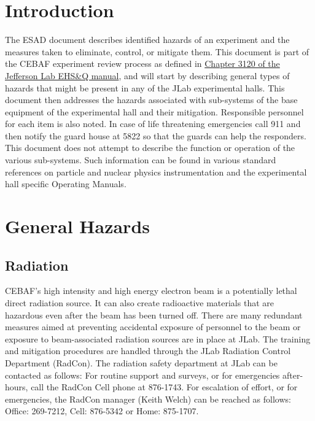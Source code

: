 
\chapter{Introduction}

The ESAD document describes identified hazards of an experiment and the measures taken to eliminate, control, or mitigate them.
This document is part of the CEBAF experiment review process as defined in
\href{http://www.jlab.org/ehs/ehsmanual/manual/3120.html}{Chapter 3120 of the Jefferson Lab EHS\&Q manual},
and will start by describing general types of hazards that might be present in any of the  
JLab experimental halls.  This document then addresses the hazards associated 
with sub-systems of the base equipment of the experimental hall and their 
mitigation.  Responsible personnel for each item is also noted.  
In case of life threatening 
emergencies call 911 and then notify the guard house at 5822 so that the guards can help
the responders.  This document does not attempt to describe the function 
or operation of the various sub-systems. Such information can be found in various 
standard references on particle and nuclear physics instrumentation and the 
experimental hall specific Operating Manuals.


\chapter{General Hazards}

\section{Radiation}
	
CEBAF's high intensity and high energy electron beam is a potentially lethal direct radiation source. 
It can also create radioactive materials that are hazardous even  after the beam has been turned off. 
There are many redundant measures aimed at preventing accidental exposure of personnel to the beam 
or exposure to beam-associated radiation sources are in place at JLab. The training and mitigation 
procedures are handled through the JLab Radiation Control Department (RadCon). The radiation safety 
department at JLab can be contacted as follows: For routine support and surveys, or for emergencies 
after-hours, call the RadCon Cell phone at 876-1743. For escalation of effort, or for emergencies, 
the RadCon manager (Keith Welch) can be reached as follows: Office: 269-7212, Cell: 876-5342 or Home:  875-1707.

